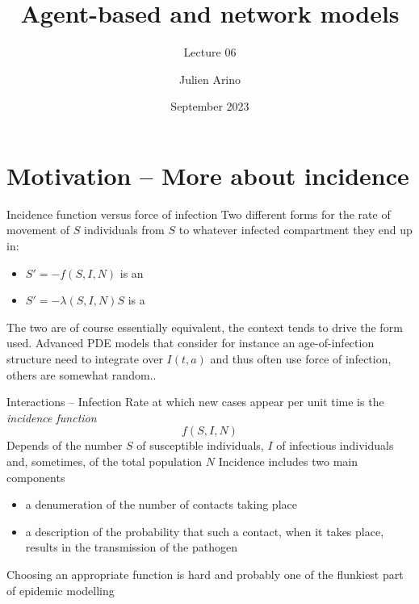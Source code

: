\documentclass[aspectratio=43]{beamer}
\title{Agent-based and network models}
\subtitle{Lecture 06}
\author{Julien Arino}
\date{September 2023}
\begin{document}



\begin{frame}
  \titlepage
\end{frame}
\addtocounter{page}{-1}

\begin{frame}
    \tableofcontents[hideallsubsections]
\end{frame}
\addtocounter{page}{-1}

\section{Motivation -- More about incidence}

\begin{frame}{Incidence function versus force of infection}
Two different forms for the rate of movement of $S$ individuals from $S$ to whatever infected compartment they end up in:

\begin{itemize}
	\item $S'=-f(S,I,N)$ is an 
	\item $S'=-\lambda(S,I,N)S$ is a 
\end{itemize} 
\vfill
The two are of course essentially equivalent, the context tends to drive the form used. Advanced PDE models that consider for instance an age-of-infection structure need to integrate over $I(t,a)$ and thus often use force of infection, others are somewhat random..
\end{frame}


\begin{frame}{Interactions -- Infection}
\bbullet Rate at which new cases appear per unit time is the \emph{incidence function}
$$
f(S,I,N)
$$
\bbullet Depends of the number $S$ of susceptible individuals, $I$ of infectious individuals and, sometimes, of the total population $N$
\bbullet Incidence includes two main components
\begin{itemize}
	\item a denumeration of the number of contacts taking place
	\item a description of the probability that such a contact, when it takes place, results in the transmission of the pathogen
\end{itemize}
\bbullet Choosing an appropriate function is hard and probably one of the flunkiest part of epidemic modelling
\end{frame}
\end{document}
